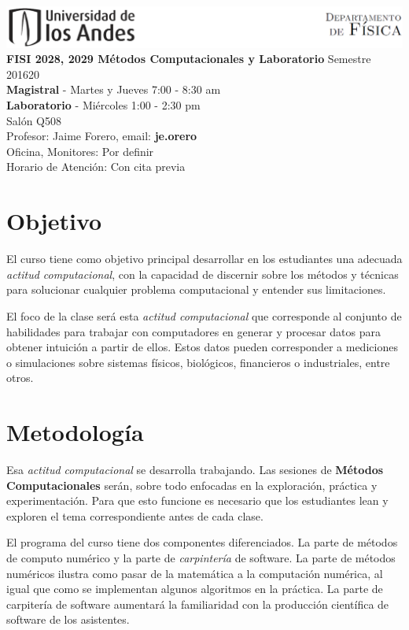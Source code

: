 \documentclass[11pt]{article}
\begin{document}
\includegraphics[width=490pt]{header.png}\\[0.5cm]

\noindent
\textbf{FISI 2028, 2029 Métodos Computacionales y Laboratorio} Semestre 201620\\
\textbf{Magistral} - Martes y Jueves 7:00 - 8:30 am \\
\textbf{Laboratorio} - Mi\'ercoles 1:00 - 2:30 pm \\
Salón Q508\\
Profesor: Jaime Forero, email: \textbf{je.orero}\\
Oficina, Monitores: Por definir\\
Horario de Atención: Con cita previa


\section*{Objetivo}
El curso tiene como objetivo principal desarrollar en los
estudiantes una adecuada \emph{actitud computacional}, con la capacidad de
discernir sobre los m\'etodos y t\'ecnicas para solucionar cualquier 
problema computacional y entender sus limitaciones.
 
El foco de la clase ser\'a esta \emph{actitud computacional} que
corresponde al conjunto de habilidades para trabajar con computadores
en generar y procesar datos para obtener intuici\'on a partir de ellos. Estos datos pueden
corresponder a mediciones o simulaciones sobre sistemas f\'isicos,
biol\'ogicos, financieros o industriales, entre otros.  

\section*{Metodolog\'ia}
Esa \emph{actitud computacional} se desarrolla trabajando. Las
sesiones de \textbf{M\'etodos Computacionales} ser\'an, sobre todo 
enfocadas en la exploraci\'on, pr\'actica y experimentaci\'on. Para que esto
funcione es necesario que los estudiantes lean y exploren el tema correspondiente antes de cada clase.

El programa del curso tiene dos componentes diferenciados. La parte de
m\'etodos de computo num\'erico y la parte de
\emph{carpinter\'ia} de software. La parte de m\'etodos num\'ericos
ilustra como pasar de la matem\'atica a la computaci\'on num\'erica,
al igual que como se implementan algunos algoritmos en la pr\'actica. 
La parte de carpiter\'ia de software aumentar\'a la familiaridad con
la producci\'on cient\'ifica de software de los asistentes.
\end{document}

